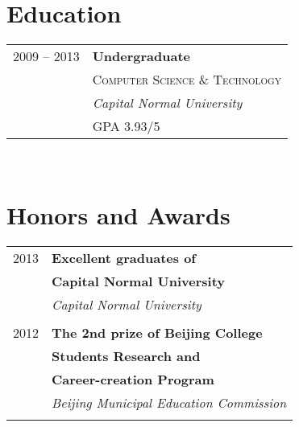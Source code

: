 \documentclass[10pt]{article} %
\begin{document}
\begin{minipage}[t]{0.44\textwidth}
\vspace{0pt} %


\section{Education}

\begin{tabular}{rl} %


2009 -- 2013 & \textbf{Undergraduate} \\
& \textsc{Computer Science \& Technology} \\
& \textit{Capital Normal University}\\
& GPA 3.93/5 \\
	

\end{tabular}\\[0pt]


\section{Honors and Awards}

\begin{tabular}{rl}

2013     &\small\textbf{Excellent graduates of}\\
& \small\textbf{ Capital Normal University}\\
& \small\textit{Capital Normal University}\\ \\
2012	 & \small\textbf{The 2nd prize of Beijing College }\\
& \small\textbf{ Students Research and }\\
& \small\textbf{ Career-creation Program}\\
& \small\textit{Beijing Municipal Education Commission}\\ \\


\end{tabular}
\end{minipage}
\end{document}
